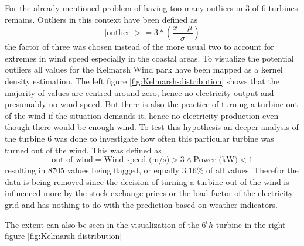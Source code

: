 \documentclass{article}
\begin{document}
For the already mentioned problem of having too many outliers in 3 of 6 turbines remains. Outliers in this context have been defined as
\begin{equation}
    |\text{outlier}| >= 3 * \left( \frac{x - \mu}{\sigma} \right)
\end{equation}
the factor of three was chosen instead of the more usual two to account for extremes in wind speed especially in the coastal areas. To visualize the potential outliers all values for the Kelmarsh Wind park have been mapped as a kernel density estimation. The left figure \ref{fig:Kelmarsh-distribution} shows that the majority of values are centred around zero, hence no electricity output and presumably no wind speed. But there is also the practice of turning a turbine out of the wind if the situation demands it, hence no electricity production even though there would be enough wind. To test this hypothesis an deeper analysis of the turbine 6 was done to investigate how often this particular turbine was turned out of the wind. This was defined as 
\begin{equation}
    \text{out of wind} = \text{Wind speed (m/s)} > 3 \land \text{Power (kW)} < 1 
\end{equation}
resulting in $8705$ values being flagged, or equally $3.16 \%$ of all values. Therefor the data is being removed since the decision of turning a turbine out of the wind is influenced more by the stock exchange prices or the load factor of the electricity grid and has nothing to do with the prediction based on weather indicators. \par 
The extent can also be seen in the visualization of the $6^th$ turbine in the right figure \ref{fig:Kelmarsh-distribution}
\end{document}
